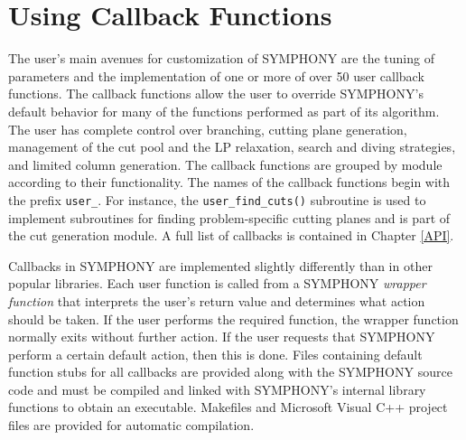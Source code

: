 \section{Using Callback Functions}\label{callback}

The user's main avenues for customization of SYMPHONY are the tuning of
parameters and the implementation of one or more of over 50 user callback
functions. The callback functions allow the user to override SYMPHONY's
default behavior for many of the functions performed as part of its algorithm.
The user has complete control over branching, cutting plane generation,
management of the cut pool and the LP relaxation, search and diving
strategies, and limited column generation. The callback functions are grouped
by module according to their functionality. The names of the callback
functions begin with the prefix \texttt{user\_}. For instance, the
\texttt{user\_find\_cuts()} subroutine is used to implement subroutines for
finding problem-specific cutting planes and is part of the cut generation
module. A full list of callbacks is contained in Chapter \ref{API}.

Callbacks in SYMPHONY are implemented slightly differently than in other
popular libraries. Each user function is called from a SYMPHONY \emph{wrapper
function} that interprets the user's return value and determines what action
should be taken. If the user performs the required function, the wrapper
function normally exits without further action. If the user requests that
SYMPHONY perform a certain default action, then this is done. Files containing
default function stubs for all callbacks are provided along with the SYMPHONY
source code and must be compiled and linked with SYMPHONY's internal library
functions to obtain an executable. Makefiles and Microsoft Visual C++ project
files are provided for automatic compilation.

